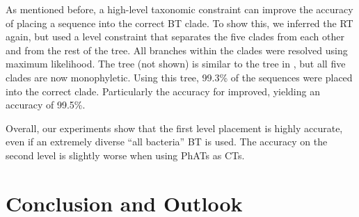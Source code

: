 As mentioned before, %
a high-level taxonomic constraint can improve the accuracy of placing a sequence into the correct \ac{BT} clade.
To show this, we inferred the  \ac{RT} again,
but used a  level constraint
that separates the five clades from each other and from the rest of the tree.
All branches within the clades were resolved using maximum likelihood.
The tree (not shown)  is similar to the tree in , but all five clades are now monophyletic.
Using this tree, 99.3\% of the sequences were placed into the correct clade.
Particularly the accuracy for  improved, yielding an accuracy of 99.5\%.


Overall, our experiments show that the first level placement is highly accurate,
even if an extremely diverse ``all bacteria'' \acl{BT} is used.
The accuracy on the second level is slightly worse when using \acp{PhAT} as \acp{CT}.



\section{Conclusion and Outlook}
\label{ch:AutomaticTrees:sec:ConclusionOutlook}


